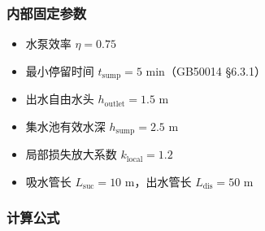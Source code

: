 \documentclass[12pt,a4paper]{ctexart}
\begin{document}
\subsubsection{内部固定参数}
\begin{itemize}[itemsep=0pt]
    \item 水泵效率 $\eta = 0.75$
    \item 最小停留时间 $t_{\text{sump}} = 5$ min（GB50014 \S6.3.1）
    \item 出水自由水头 $h_{\text{outlet}} = 1.5$ m
    \item 集水池有效水深 $h_{\text{sump}} = 2.5$ m
    \item 局部损失放大系数 $k_{\text{local}} = 1.2$
    \item 吸水管长 $L_{\text{suc}} = 10$ m，出水管长 $L_{\text{dis}} = 50$ m
\end{itemize}

\subsubsection{计算公式}
\end{document}
